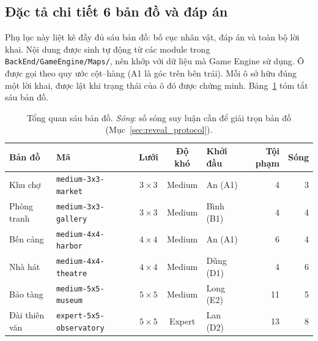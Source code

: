 \subsection{Đặc tả chi tiết 6 bản đồ và đáp án}
\label{sec:map_specifications}

Phụ lục này liệt kê đầy đủ sáu bản đồ: bố cục nhân vật, đáp án và toàn bộ lời
khai. Nội dung được sinh tự động từ các module trong
\nolinkurl{BackEnd/GameEngine/Maps/}, nên khớp với dữ liệu mà Game Engine sử dụng.
Ô được gọi theo quy ước cột--hàng (A1 là góc trên bên trái). Mỗi ô sở hữu đúng
một lời khai, được lật khi trạng thái của ô đó được chứng minh. Bảng~\ref{tab:map_overview}
tóm tắt sáu bản đồ.

\begin{table}[htbp]
  \centering\footnotesize
  \caption{Tổng quan sáu bản đồ. \emph{Sóng}: số sóng suy luận cần để giải
    trọn bản đồ (Mục~\ref{sec:reveal_protocol}).}
  \label{tab:map_overview}
  \begin{tabular}{llcclrr}
    \toprule
    \textbf{Bản đồ} & \textbf{Mã} & \textbf{Lưới} & \textbf{Độ khó}
      & \textbf{Khởi đầu} & \textbf{Tội phạm} & \textbf{Sóng} \\
    \midrule
    Khu chợ       & \texttt{medium-3x3-market}       & $3\times3$ & Medium & An (A1)   &  4 & 3 \\
    Phòng tranh   & \texttt{medium-3x3-gallery}      & $3\times3$ & Medium & Bình (B1) &  4 & 4 \\
    Bến cảng      & \texttt{medium-4x4-harbor}       & $4\times4$ & Medium & An (A1)   &  6 & 4 \\
    Nhà hát       & \texttt{medium-4x4-theatre}      & $4\times4$ & Medium & Dũng (D1) &  4 & 6 \\
    Bảo tàng      & \texttt{medium-5x5-museum}       & $5\times5$ & Medium & Long (E2) & 11 & 5 \\
    Đài thiên văn & \texttt{expert-5x5-observatory}  & $5\times5$ & Expert & Lan (D2)  & 13 & 8 \\
    \bottomrule
  \end{tabular}
\end{table}

